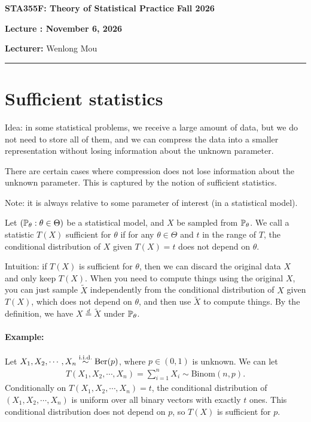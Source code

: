 \documentclass[11pt,letterpaper]{article}
\newcommand{\coursenumber}{STA355F}
\newcommand{\coursetitle}{Theory of Statistical Practice}
\newcommand{\courseterm}{Fall 2026}
\newcounter{lecture}
\newcommand{\lecturenumber}{\arabic{lecture}}
\newcommand{\lecturedate}{November 6, 2026}
\newcommand{\lecturer}{Wenlong Mou}
\numberwithin{assumption}{lecture}
\numberwithin{theorem}{lecture}
\numberwithin{proposition}{lecture}
\numberwithin{lemma}{lecture}
\numberwithin{claim}{lecture}
\numberwithin{corollary}{lecture}
\numberwithin{definition}{lecture}
\numberwithin{conjecture}{lecture}
\numberwithin{remark}{lecture}
\numberwithin{example}{lecture}
\numberwithin{equation}{lecture}
\newcommand{\makelecturenotesheader}{%
  \noindent
  \textbf{\coursenumber: \coursetitle}%
  \hfill
  \textbf{\courseterm}

  \begin{center}
    {\Large\bfseries Lecture \lecturenumber: \lecturedate}
  \end{center}

  \noindent
  \textbf{Lecturer:} \lecturer
  \par\medskip
  \hrule
  \bigskip
}
\begin{document}
\makelecturenotesheader

\section{Sufficient statistics}
Idea: in some statistical problems, we receive a large amount of data, but we do not need to store all of them, and we can compress the data into a smaller representation without losing information about the unknown parameter.

There are certain cases where compression does not lose information about the unknown parameter. This is captured by the notion of sufficient statistics.

Note: it is always relative to some parameter of interest (in a statistical model).

\begin{definition}
  Let $({\mathbb{P}}_\theta: \theta \in \Theta)$ be a statistical model, and $X$ be sampled from ${\mathbb{P}}_\theta$. We call a statistic $T (X)$ sufficient for $\theta$ if for any $\theta \in \Theta$ and $t$ in the range of $T$, the conditional distribution of $X$ given $T(X) = t$ does not depend on $\theta$.
\end{definition}
Intuition: if $T(X)$ is sufficient for $\theta$, then we can discard the original data $X$ and only keep $T(X)$. When you need to compute things using the original $X$, you can just sample $\widetilde{X}$ independently from the conditional distribution of $X$ given $T(X)$, which does not depend on $\theta$, and then use $\widetilde{X}$ to compute things. By the definition, we have $X \overset{d}{=} \widetilde{X}$ under ${\mathbb{P}}_\theta$.

\paragraph{Example:} Let $X_1, X_2, \cdots, X_n \overset{\mathrm{i.i.d.}}{\sim} \mathrm{Ber} (p)$, where $p \in (0,1)$ is unknown. We can let
\begin{align*}
  T (X_1, X_2, \cdots, X_n) = \sum_{i=1}^n X_i \sim \mathrm{Binom}(n, p).
\end{align*}
Conditionally on $T (X_1, X_2, \cdots, X_n) = t$, the conditional distribution of $(X_1, X_2, \cdots, X_n)$ is uniform over all binary vectors with exactly $t$ ones. This conditional distribution does not depend on $p$, so $T(X)$ is sufficient for $p$.
\end{document}
